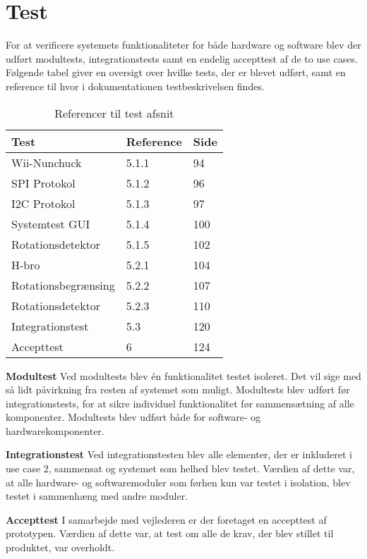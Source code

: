 \chapter{Test}
For at verificere systemets funktionaliteter for både hardware og software blev der udført modultests, integrationstests samt en endelig accepttest af de to use cases. Følgende tabel giver en oversigt over hvilke tests, der er blevet udført, samt en reference til hvor i dokumentationen testbeskrivelsen findes.

\begin{table}[H]
	\centering
	\label{test}
	\begin{tabular}{|l|l|l|}
		\hline
		\textbf{Test}      & \textbf{Reference} & \textbf{Side}\\ \hline
		Wii-Nunchuck        & 5.1.1 & 94              \\ \hline
		SPI Protokol        & 5.1.2 & 96              \\ \hline
		I2C Protokol        & 5.1.3 & 97             \\ \hline
		Systemtest GUI   & 5.1.4 & 100               \\ \hline
		Rotationsdetektor   & 5.1.5 & 102             \\ \hline
		H-bro               & 5.2.1 & 104             \\ \hline
		Rotationsbegrænsing & 5.2.2 & 107              \\ \hline
		Rotationsdetektor   & 5.2.3 & 110             \\ \hline
		Integrationstest    & 5.3 & 120                \\ \hline
		Accepttest          & 6 & 124                  \\ \hline
		
	\end{tabular}
	\caption{Referencer til test afsnit}
\end{table}

\noindent \textbf{Modultest} \newline
\noindent Ved modultests blev én funktionalitet testet isoleret. Det vil sige med så lidt påvirkning fra resten af systemet som muligt. Modultests blev udført før integrationstests, for at sikre individuel funktionalitet før sammensætning af alle komponenter. Modultests blev udført både for software- og hardwarekomponenter. \newline

\noindent \textbf{Integrationstest} \newline
\noindent Ved integrationstesten blev alle elementer, der er inkluderet i use case 2, sammensat og systemet som helhed blev testet. Værdien af dette var, at alle hardware- og softwaremoduler som førhen kun var testet i isolation, blev testet i sammenhæng med andre moduler.  \newline

\noindent \textbf{Accepttest} \newline
\noindent I samarbejde med vejlederen er der foretaget en accepttest af prototypen. Værdien af dette var, at test om alle de krav, der blev stillet til produktet, var overholdt.
